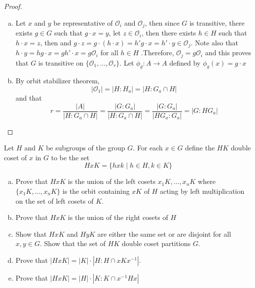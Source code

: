 \documentclass{article}
\newcommand{\orbit}{\mathcal{O}}
\newenvironment{problem}[2][Problem]{\begin{trivlist}
\item[\hskip \labelsep {\bfseries #1}\hskip \labelsep {\bfseries #2.}]}{\end{trivlist}}
\begin{document}
\begin{proof}
    \begin{enumerate}[(a)]
        \item Let $x$ and $y$ be representative of $\orbit_i$ and $\orbit_j$, then since $G$ is transitive, there exists $g \in G$ such that $g \cdot x =y$, let $z \in \orbit_i$, then there exists $h \in H$ such that $h \cdot x =z$, then  and $g \cdot z = g \cdot (h \cdot x) = h'g \cdot x =h' \cdot y\in \orbit_j$. Note also that $h \cdot y = hg \cdot x = gh' \cdot x =g\orbit_i$ for all $h \in H$ 
        .Therefore, $\orbit_j =g \orbit_i$ and this proves that $G$ is transitive on $\{\orbit_1, ..., \orbit_r\}$. Let $\phi_g: A \rightarrow A$ defined by $\phi_g(x) =g\cdot x$
        \item By orbit stabilizer theorem, 
        \[
            |\orbit_1| = |H : H_a|=|H : G_a \cap H|
        \] and that 
        \[
        r = \frac{|A|}{|H:G_a\cap H|} =\frac{|G: G_a|}{|H : G_a \cap H|}=\frac{|G:G_a|}{|HG_a: G_a|}=|G:HG_a|
        \]
    \end{enumerate}
\end{proof}
\begin{problem}{10}
    Let $H$ and $K$ be subgroups of the group $G$. For each $x \in G$ define the $H K$ double coset of $x $ in $G$ to be the set 
    \[
    HxK=\{hxk \mid h \in H, k \in K\}
    \]
    \begin{enumerate}[(a)]
        \item Prove that $HxK$ is the union of the left cosets $x_1K, ..., x_n K$ where $\{x_1K, ..., x_nK\}$ is the orbit containing $x K$ of $H$ acting by left multiplication on the set of left cosets of $K$.
        \item Prove that $HxK$ is the union of the right cosets of $H$
        \item Show that $HxK$ and $HyK$ are either the same set or are disjoint for all $x, y \in G$. Show that the set of $HK$ double coset partitions $G$.
        \item Prove that $|HxK|=|K|\cdot |H:H\cap xKx^{-1}|$.
        \item Prove that $|HxK|=|H|\cdot |K:K\cap x^{-1}Hx|$
    \end{enumerate}
\end{problem}
\end{document}
